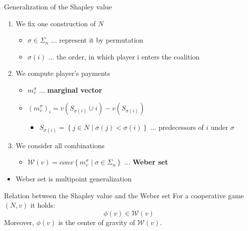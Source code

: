 \documentclass{beamer}
\begin{document}
\begin{frame}{Generalization of the Shapley value}
    \begin{enumerate}
		\item We fix one construction of $N$
		\begin{itemize}
			\item $\sigma \in \Sigma_n$ ... represent it by permutation
			\item $\sigma(i)$ ... the order, in which player i enters the coalition
		\end{itemize}
		\item We compute player's payments
		\begin{itemize}
			\item $m^\sigma_v$ ... \textbf{marginal vector}
			\item $\left(m^\sigma_v\right)_i=v\left(S_{\sigma(i)}\cup i\right)-v\left(S_{\sigma(i)}\right)$
			\begin{itemize}
				\item $S_{\sigma(i)}= \left\{j \in N \mid \sigma(j) < \sigma(i)\right\}$ ... predecessors of $i$ under $\sigma$
			\end{itemize}
		\end{itemize}
		\item We consider all combinations
		\begin{itemize}
			\item $\mathcal{W}(v)=conv\left\{m^{\sigma}_{v}\mid \sigma \in \Sigma_n\right\}$ ... \textbf{Weber set}
		\end{itemize}
	\end{enumerate}
	\begin{itemize}
		\item Weber set is multipoint generalization
	\end{itemize}
	\begin{block}{Relation between the Shapley value and the Weber set}
		For a cooperative game $(N,v)$ it holds:
		\[\phi(v) \in \mathcal{W}(v)\]
		Moreover, $\phi(v)$ is the center of gravity of $\mathcal{W}(v)$.
	\end{block}
\end{frame}


\end{document}
